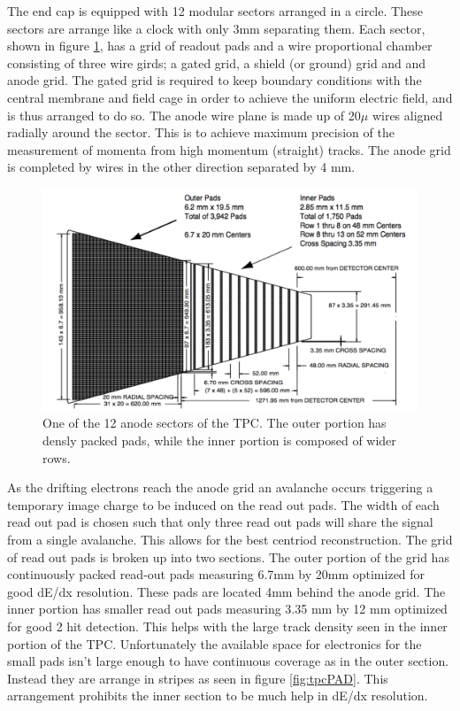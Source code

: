 \documentclass[abstract = on,listof=totoc, bibliography=totoc]{scrreprt}
\begin{document}
The end cap is equipped with 12 modular sectors arranged in a circle. These sectors are arrange like a clock with only 3mm separating them. Each sector, shown in figure \ref{fig:tpcPad}, has a grid of readout pads and a wire proportional chamber consisting of three wire girds; a gated grid, a shield (or ground) grid and and anode grid. The gated grid is required to keep boundary conditions with the central membrane and field cage in order to achieve the uniform electric field, and is thus arranged to do so. The anode wire plane is made up of 20$\mu$ wires aligned radially around the sector. This is to achieve maximum precision of the measurement of momenta from high momentum (straight) tracks. The anode grid is completed by wires in the other direction separated by 4 mm.

\begin{figure}
\begin{center}
\includegraphics[width = 1\textwidth]{tpcPAD}
\caption[Anode sector of STAR TPC]{One of the 12 anode sectors of the TPC. The outer portion has densly packed pads, while the inner portion is composed of wider rows.}
\label{fig:tpcPad}
\end{center}
\end{figure}


As the drifting electrons reach the anode grid an avalanche occurs triggering a temporary image charge to be induced on the read out pads. The width of each read out pad is chosen such that only three read out pads will share the signal from a single avalanche. This allows for the best centriod reconstruction. The grid of read out pads is broken up into two sections. The outer portion of the grid has continuously packed read-out pads measuring 6.7mm by 20mm optimized for good dE/dx resolution. These pads are located 4mm behind the anode grid. The inner portion has smaller read out pads measuring 3.35 mm by 12 mm optimized for good 2 hit detection. This helps with the large track density seen in the inner portion of the TPC. Unfortunately the available space for electronics for the small pads isn't large enough to have continuous coverage as in the outer section. Instead they are arrange in stripes as seen in figure \ref{fig:tpcPAD}. This arrangement prohibits the inner section to be much help in dE/dx resolution. \cite{TPC}
\end{document}
